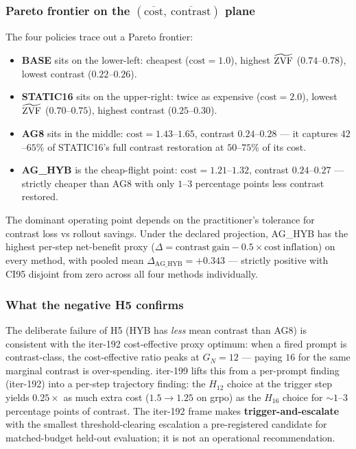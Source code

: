 \subsubsection*{Pareto frontier on the $(\overline{\mathrm{cost}},\ \overline{\mathrm{contrast}})$ plane}

The four policies trace out a Pareto frontier:
\begin{itemize}
\item \textbf{BASE} sits on the lower-left: cheapest ($\mathrm{cost}=1.0$),
  highest $\widetilde{\mathrm{ZVF}}$ ($0.74$--$0.78$), lowest contrast ($0.22$--$0.26$).
\item \textbf{STATIC16} sits on the upper-right: twice as expensive
  ($\mathrm{cost}=2.0$), lowest $\widetilde{\mathrm{ZVF}}$ ($0.70$--$0.75$), highest contrast
  ($0.25$--$0.30$).
\item \textbf{AG8} sits in the middle: $\mathrm{cost}=1.43$--$1.65$, contrast
  $0.24$--$0.28$ --- it captures $42$--$65\%$ of STATIC16's full contrast
  restoration at $50$--$75\%$ of its cost.
\item \textbf{AG\_HYB} is the cheap-flight point: $\mathrm{cost}=1.21$--$1.32$,
  contrast $0.24$--$0.27$ --- strictly cheaper than AG8 with only $1$--$3$
  percentage points less contrast restored.
\end{itemize}
The dominant operating point depends on the practitioner's tolerance for
contrast loss vs rollout savings. Under the declared projection, AG\_HYB has
the highest per-step net-benefit proxy
($\Delta = \mathrm{contrast\ gain} - 0.5 \times \mathrm{cost\ inflation}$)
on every method, with pooled mean $\Delta_{\text{AG\_HYB}}=+0.343$ ---
strictly positive with CI95 disjoint from zero across all four methods
individually.

\subsubsection*{What the negative H5 confirms}

The deliberate failure of H5 (HYB has \emph{less} mean contrast than AG8) is
consistent with the iter-192 cost-effective proxy optimum: when a fired
prompt is contrast-class, the cost-effective ratio peaks at $G_N=12$ --- paying
$16$ for the same marginal contrast is over-spending. iter-199 lifts this
from a per-prompt finding (iter-192) into a per-step trajectory finding: the
$H_{12}$ choice at the trigger step yields $0.25\times$ as much extra cost
($1.5 \to 1.25$ on grpo) as the $H_{16}$ choice for $\sim 1$--$3$ percentage
points of contrast.  The iter-192 frame makes \textbf{trigger-and-escalate}
with the smallest threshold-clearing escalation a pre-registered candidate for
matched-budget held-out evaluation; it is not an operational recommendation.

